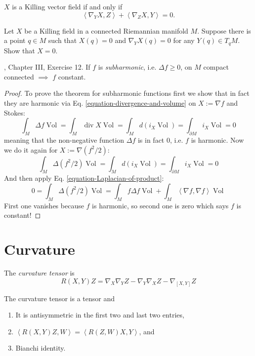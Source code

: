 \begin{exercise}
\label{exercise-killing}
$X$ is a Killing vector field if and only if
$$
\left\langle{}\nabla_YX,Z\right\rangle{} +
\left\langle{}\nabla_ZX,Y\right\rangle{}=0.
$$
\end{exercise}

\begin{exercise}
\label{exercise-killi-field-zero-order}
Let $X$ be a Killing field in a connected
Riemannian manifold $M$.
Suppose there is a point $q \in M$ such that
$X(q)=0$ and $\nabla_YX(q)=0$ for any $Y(q)
\in T_qM$.
Show that $X=0$.
\end{exercise}


\begin{exercise}
\label{exercise-maximum-principle}
\cite{doc}, Chapter III, Exercise 12. If $f$
is {\it subharmonic}, i.e.
$\Delta f\geq 0$, on $M$
compact connected $\implies$ $f$ constant.
\end{exercise}

\begin{proof}
To prove the theorem for subharmonic
functions first we show that in fact they
are harmonic via Eq.
\ref{equation-divergence-and-volume}
on $X:= \nabla f$ and Stokes:
$$
\int_M \Delta f \operatorname{Vol}=\int_M
\operatorname{div}X \operatorname{Vol}
=\int_M d(i_X
\operatorname{Vol})=\int_{\partial M}i_X
\operatorname{Vol}=0
$$
meaning that the non-negative function
$\Delta f$ is in fact 0, i.e. $f$ is
harmonic. Now we do it again for
$X:=\nabla(f^2/2)$:
$$
\int_M \Delta(f^2/2)\operatorname{Vol}
=\int_M d(i_X \operatorname{Vol})
=\int_{\partial M}i_X \operatorname{Vol}
=0
$$
And then apply Eq.
\ref{equation-Laplacian-of-product}:
$$
0=\int_M \Delta(f^2/2)\operatorname{Vol}
=\int_M f \Delta f \operatorname{Vol}
+\int_M \left\langle{}\nabla f,\nabla
f\right\rangle{}\operatorname{Vol}
$$
First one vanishes because $f$ is harmonic,
so second one is zero which says
 $f$ is constant!
\end{proof}


\section{Curvature}
\label{section-curvature}

The {\it curvature tensor} is
\begin{equation}
\label{equation-curvature-tensor}
R(X,Y)Z=\nabla_X\nabla_YZ-\nabla_Y\nabla_XZ-
\nabla_{[X,Y]}Z
\end{equation}

\begin{proposition}
\label{proposition-symme-curva-tenso}
The curvature tensor is a tensor and
\begin{enumerate}
\item It is antisymmetric in the first two
and last two entries,
\item
$\left\langle{}R(X,Y)Z,W\right\rangle{}=\left\langle{}R(Z,W)X,
Y\right\rangle{}$,
and
\item Bianchi identity.
\end{enumerate}
\end{proposition}

